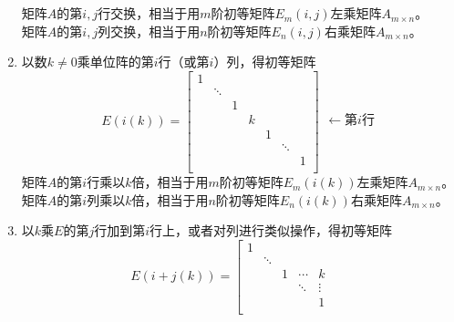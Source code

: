 \begin{enumerate}
\begin{equation*}
\begin{array}{c}
      \\
    \end{array}
  \end{equation*}
  矩阵$A$的第$i,j$行交换，相当于用$m$阶初等矩阵$E_m(i,j)$左乘矩阵$A_{m\times n}$。\\
  矩阵$A$的第$i,j$列交换，相当于用$n$阶初等矩阵$E_n(i,j)$右乘矩阵$A_{m\times n}$。
  \item 以数$k\neq 0$乘单位阵的第$i$行（或第$i$）列，得初等矩阵
  \begin{equation*}
    E(i(k)) = \left[\begin{array}{ccccccc}
      1 & & & & & & \\
        & \ddots & & & & & \\
        &        & 1 & & & & \\
        &        &   & k & & & \\
        &        &   &   & 1 & & \\
        &        &   &   &   & \ddots & \\
        &        &   &   &   &        & 1 \\
    \end{array}\right]\begin{array}{c}
        \\
        \\
        \\
        \leftarrow\text{第$i$行}\\
        \\
        \\
        \\
    \end{array}
  \end{equation*}
  矩阵$A$的第$i$行乘以$k$倍，相当于用$m$阶初等矩阵$E_m(i(k))$左乘矩阵$A_{m\times n}$。\\
  矩阵$A$的第$i$列乘以$k$倍，相当于用$n$阶初等矩阵$E_n(i(k))$右乘矩阵$A_{m\times n}$。
  \item 以$k$乘$E$的第$j$行加到第$i$行上，或者对列进行类似操作，得初等矩阵
  \begin{equation*}
    E(i+j(k)) = \left[\begin{array}{ccccccc}
      1 & & & & & & \\
        & \ddots & & & & & \\
        &        & 1 & \cdots & k & & \\
        &        &   & \ddots & \vdots  & & \\
        &        &   &        & 1 & & \\

\end{array}
\end{equation*}
\end{enumerate}
